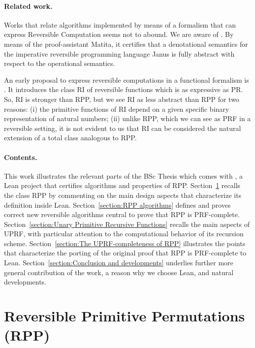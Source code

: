 \documentclass[runningheads]{llncs}
\newcommand{\RPP}{\textsf{RPP}\xspace}
\newcommand{\UPRF}{\textsf{UPRF}\xspace}
\newcommand{\PRF}{\textsf{PRF}\xspace}
\newcommand{\PR}{\textsf{PR}\xspace}
\newcommand{\LEAN}{\textsf{Lean}\xspace}
\newcommand{\JMF}{\textsf{RI}\xspace} %
\newcommand{\Janus}{\textsf{Janus}\xspace}
\newcommand{\Matita}{\textsf{Matita}\xspace}
\begin{document}
\paragraph{Related work.}
Works that relate algorithms implemented by means of a formalism that can express Reversible Computation seems not to abound. We are aware of \cite{paoliniTYPES2015}. By means of the proof-assistant \Matita \cite{Asperti2007}, it certifies that a denotational semantics for the imperative reversible programming language \Janus \cite[Section 8.3.3]{perumalla2013chc} is fully abstract with respect to the operational semantics.

An early proposal to express reversible computations in a functional formalism is \cite{jacopini89tcs}. It introduces the class \JMF of reversible functions which is as expressive as \PR. So, \JMF is stronger than \RPP, but we see \JMF as less abstract than \RPP for two reasons: (i) the primitive functions of \JMF depend on a given specific binary representation of natural numbers; (ii) unlike \RPP, which we can see as \PRF in a reversible setting, it is not evident to us that \JMF can be considered the natural extension of a total class analogous to \RPP.

\paragraph{Contents.}
This work illustrates the relevant parts of the BSc Thesis \cite{MalettoBSc2021} which comes with \cite{MalettoRPPLEAN2021}, a \LEAN project that certifies algorithms and properties of \RPP.
Section~\ref{section:Reversible Primitive Permutations} recalls the class \RPP by commenting on the main design aspects that characterize its definition inside \LEAN.
Section~\ref{section:RPP algorithms} defines and proves correct new reversible algorithms central to prove that \RPP is \PRF-complete.
Section~\ref{section:Unary Primitive Recursive Functions} recalls the main aspects of \UPRF, with particular attention to the computational behavior of its recursion scheme.
Section~\ref{section:The UPRF-completeness of RPP} illustrates the points that characterize the porting of the original proof that \RPP is \PRF-complete to \LEAN.
Section~\ref{section:Conclusion and developments} underlies further more general contribution of the work, a reason why we choose \LEAN,  and natural developments.

\section{Reversible Primitive Permutations (\RPP) }
\label{section:Reversible Primitive Permutations}
\end{document}
